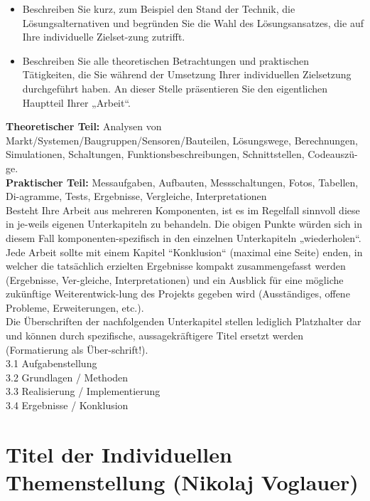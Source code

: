 \documentclass[12pt]{article}
\begin{document}
\begin{itemize}
    \item Beschreiben Sie kurz, zum Beispiel den Stand der Technik, die Lösungsalternativen und begründen Sie die Wahl des Lösungsansatzes, die auf Ihre individuelle Zielset-zung zutrifft. 
    \item Beschreiben Sie alle theoretischen Betrachtungen und praktischen Tätigkeiten, die Sie während der Umsetzung Ihrer individuellen Zielsetzung durchgeführt haben. An dieser Stelle präsentieren Sie den eigentlichen Hauptteil Ihrer „Arbeit“.
\end{itemize}

\textbf{Theoretischer Teil:} Analysen von Markt/Systemen/Baugruppen/Sensoren/Bauteilen, Lösungswege, Berechnungen, Simulationen, Schaltungen, Funktionsbeschreibungen, Schnittstellen, Codeauszü-ge. \\
\textbf{Praktischer Teil:} Messaufgaben, Aufbauten, Messschaltungen, Fotos, Tabellen, Di-agramme, Tests, Ergebnisse, Vergleiche, Interpretationen\\
Besteht Ihre Arbeit aus mehreren Komponenten, ist es im Regelfall sinnvoll diese in je-weils eigenen Unterkapiteln zu behandeln. Die obigen Punkte würden sich in diesem Fall komponenten-spezifisch in den einzelnen Unterkapiteln „wiederholen“. \\
Jede Arbeit sollte mit einem Kapitel “Konklusion“ (maximal eine Seite) enden, in welcher die tatsächlich erzielten Ergebnisse kompakt zusammengefasst werden (Ergebnisse, Ver-gleiche, Interpretationen) und ein Ausblick für eine mögliche zukünftige Weiterentwick-lung des Projekts gegeben wird (Ausständiges, offene Probleme, Erweiterungen, etc.).\\
Die Überschriften der nachfolgenden Unterkapitel stellen lediglich Platzhalter dar und können durch spezifische, aussagekräftigere Titel ersetzt werden (Formatierung als Über-schrift!).\\
3.1 Aufgabenstellung\\
3.2 Grundlagen / Methoden\\
3.3 Realisierung / Implementierung\\
3.4 Ergebnisse / Konklusion\\

\color{black}
\newpage



\newpage



\newpage
\section{Titel der Individuellen Themenstellung (Nikolaj Voglauer)}
\end{document}
